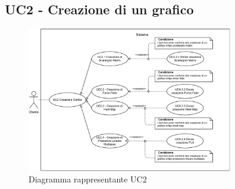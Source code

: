 \newpage
\subsection{UC2 - Creazione di un grafico}
\label{sub:uc2}

\begin{figure}[h]
    \centering
    \includegraphics[width=0.8\textwidth]{componenti/casi-duso/diagrammi/UC2.pdf}
    \caption{Diagramma rappresentante UC2}
    \label{fig:UC2}
\end{figure}


